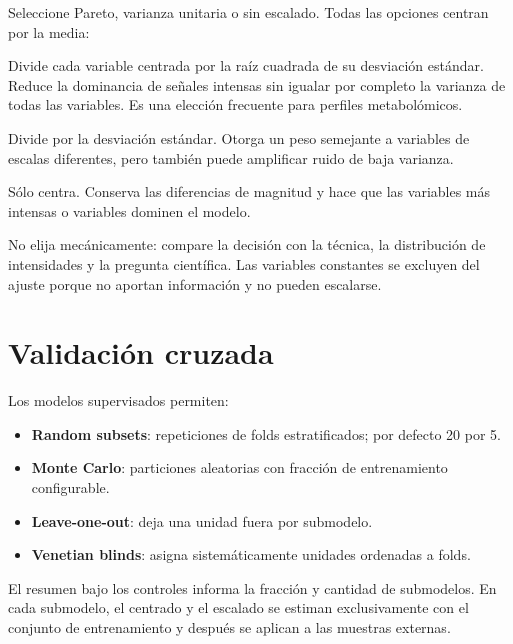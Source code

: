 \documentclass[11pt,a4paper,openany]{report}
\begin{document}
Seleccione Pareto, varianza unitaria o sin escalado. Todas las opciones centran
por la media:

\begin{description}[leftmargin=3.2cm,style=nextline]
  \item[Pareto] Divide cada variable centrada por la raíz cuadrada de su
  desviación estándar. Reduce la dominancia de señales intensas sin igualar por
  completo la varianza de todas las variables. Es una elección frecuente para
  perfiles metabolómicos.
  \item[Varianza unitaria] Divide por la desviación estándar. Otorga un peso
  semejante a variables de escalas diferentes, pero también puede amplificar
  ruido de baja varianza.
  \item[Sin escalado] Sólo centra. Conserva las diferencias de magnitud y hace
  que las variables más intensas o variables dominen el modelo.
\end{description}

No elija mecánicamente: compare la decisión con la técnica, la distribución de
intensidades y la pregunta científica. Las variables constantes se excluyen del
ajuste porque no aportan información y no pueden escalarse.

\section{Validación cruzada}

Los modelos supervisados permiten:

\begin{itemize}[leftmargin=*]
  \item \textbf{Random subsets}: repeticiones de folds estratificados; por
  defecto 20 por 5.
  \item \textbf{Monte Carlo}: particiones aleatorias con fracción de entrenamiento
  configurable.
  \item \textbf{Leave-one-out}: deja una unidad fuera por submodelo.
  \item \textbf{Venetian blinds}: asigna sistemáticamente unidades ordenadas a
  folds.
\end{itemize}

El resumen bajo los controles informa la fracción y cantidad de submodelos. En cada
submodelo, el centrado y el escalado se estiman exclusivamente con el conjunto
de entrenamiento y después se aplican a las muestras externas.
\end{document}
